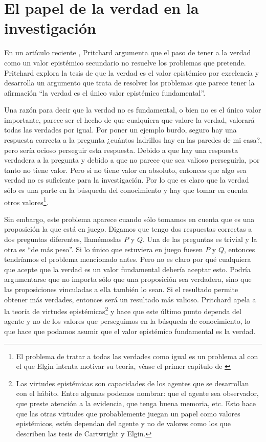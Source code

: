 \section{El papel de la verdad en la investigación}

\noindent En un artículo reciente \cite{Pritchard2019}, Pritchard argumenta que el paso de tener a la verdad como un valor epistémico secundario no resuelve los problemas que pretende. Pritchard explora la tesis de que la verdad es el valor epistémico por excelencia y desarrolla un argumento que trata de resolver los problemas que parece tener la afirmación ``la verdad es el único valor epistémico fundamental''.

Una razón para decir que la verdad no es fundamental, o bien no es el único valor importante, parece ser el hecho de que cualquiera que valore la verdad, valorará todas las verdades por igual. Por poner un ejemplo burdo, seguro hay una respuesta correcta a la pregunta ¿cuántos ladrillos hay en las paredes de mi casa?, pero sería ocioso perseguir esta respuesta. Debido a que hay una respuesta verdadera a la pregunta y debido a que no parece que sea valioso perseguirla, por tanto no tiene valor. Pero si no tiene valor en absoluto, entonces que algo sea verdad no es suficiente para la investigación. Por lo que es claro que la verdad sólo es una parte en la búsqueda del conocimiento y hay que tomar en cuenta otros valores\footnote{El problema de tratar a todas las verdades como igual es un problema al con el que%
Elgin intenta motivar su teoría, véase el primer capítulo de \cite{Elgin2017}}.

Sin embargo, este problema aparece cuando sólo tomamos en cuenta que es una proposición la que está en juego. Digamos que tengo dos respuestas correctas a dos preguntas diferentes, llamémoslas $P$ y $Q$. Una de las preguntas es trivial y la otra es ``de más peso''. Si lo único que estuviera en juego fuesen $P$ y $Q$, entonces tendríamos el problema mencionado antes. Pero no es claro por qué cualquiera que acepte que la verdad es un valor fundamental debería aceptar esto. Podría argumentarse que no importa sólo que una proposición sea verdadera, sino que las proposiciones vinculadas a ella también lo sean. Si el resultado permite obtener más verdades, entonces será un resultado más valioso. Pritchard apela a la teoría de virtudes epistémicas\footnote{Las virtudes epistémicas son capacidades de los agentes que se desarrollan con el hábito. Entre algunas podemos nombrar: que el agente sea observador, que preste atención a la evidencia, que tenga buena memoria, etc. Esto hace que las otras virtudes que probablemente juegan un papel como valores epistémicos, estén dependan del agente y no de valores como los que describen las tesis de Cartwright y Elgin.} y hace que este último punto dependa del agente y no de los valores que perseguimos en la búsqueda de conocimiento, lo que hace que podamos asumir que el valor epistémico fundamental es la verdad.

